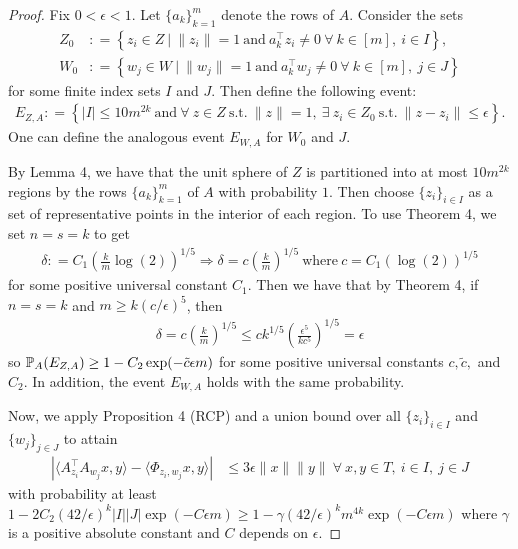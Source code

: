 \documentclass{article}
\begin{document}
\begin{proof}
Fix $0 < \epsilon < 1$. Let $\{a_k\}_{k=1}^m$ denote the rows of $A$. Consider the sets \begin{align*}
Z_0 & : = \left\{z_i \in Z\ |\ \|z_i\| = 1\ \text{and}\ a_k^\top z_i \neq 0\ \forall\ k \in [m],\ i \in I\right\}, \\
W_0 & : = \left\{w_j \in W\ |\ \|w_j\| = 1\ \text{and}\ a_k^\top w_j \neq 0\ \forall\ k \in [m],\ j \in J\right\}
\end{align*} for some finite index sets $I$ and $J$. Then define the following event: \begin{align*}
E_{Z,A} : = \left\{|I| \leq 10m^{2k}\ \text{and}\ \forall\ z \in Z\ \text{s.t.}\ \|z\| = 1,\ \exists\ z_i \in Z_0\ 
\text{s.t.}\ \|z - z_i\| \leq \epsilon\right\}.
\end{align*} One can define the analogous event $E_{W,A}$ for $W_0$ and $J$.

By Lemma 4, we have that the unit sphere of $Z$ is partitioned into at most $10m^{2k}$ regions by the rows $\{a_k\}_{k=1}^m$ of $A$ with probability $1$. Then choose $\{z_i\}_{i \in I}$ as a set of representative points in the interior of each region. To use Theorem 4, we set $n = s = k$ to get \begin{align*}
\delta : = C_1 \left(\frac{k}{m} \log (2)\right)^{1/5} \Longrightarrow \delta = c \left(\frac{k}{m}\right)^{1/5}\ \text{where}\ c = C_1 \left(\log(2)\right)^{1/5}
\end{align*} for some positive universal constant $C_1$. Then we have that by Theorem 4, if $n = s = k$ and $m \geq k(c/\epsilon)^5$, then \begin{align*}
\delta = c \left(\frac{k}{m}\right)^{1/5} \leq ck^{1/5}\left(\frac{\epsilon^5}{kc^5}\right)^{1/5} = \epsilon
\end{align*} so  $\operatorname{\mathbb{P}}_A(E_{Z,A}) \geq 1 - C_2 \exp(-\tilde{c}\epsilon m)$ for some positive universal constants $c,\tilde{c},$ and $C_2$. In addition, the event $E_{W,A}$ holds with the same probability.

Now, we apply Proposition 4 (RCP) and a union bound over all $\{z_i\}_{i \in I}$ and $\{w_j\}_{j \in J}$ to attain \begin{align}
\left|\langle A_{z_i}^\top A_{w_j} x,y \rangle - \langle \Phi_{z_i,w_j}x,y \rangle\right| & \leq 3\epsilon \|x\|\|y\|\ \forall\ x,y \in T,\ i \in I,\ j \in J \label{conc_bound_Zi_Wj}
\end{align} with probability at least $1 - 2C_2(42/\epsilon)^k|I||J|\exp(-C \epsilon m) \geq 1 - \gamma (42/\epsilon)^k m^{4k}\exp(-C \epsilon m)$ where $\gamma$ is a positive absolute constant and $C$ depends on $\epsilon$.


\end{proof}
\end{document}
